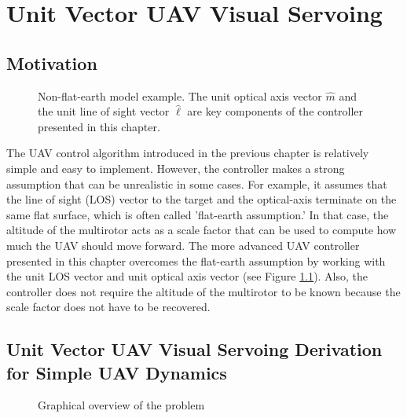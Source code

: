 \chapter{Unit Vector UAV Visual Servoing}
\label{chapter4}
\section{Motivation}
\begin{figure}[htbp]
	\centering
	\caption[Non-flat-earth model example.]{Non-flat-earth model example. The unit optical axis vector $\hat{m}$ and the unit line of sight vector $\hat{\ell}$ are key components of the controller presented in this chapter.}
	\label{nonflatearth}
\end{figure}
The UAV control algorithm introduced in the previous chapter is relatively simple and easy to implement. However, the controller makes a strong assumption that can be unrealistic in some cases. For example, it assumes that the line of sight (LOS) vector to the target and the optical-axis terminate on the same flat surface, which is often called 'flat-earth assumption.' In that case, the altitude of the multirotor acts as a scale factor that can be used to compute how much the UAV should move forward. The more advanced UAV controller presented in this chapter overcomes the flat-earth assumption by working with the unit LOS vector and unit optical axis vector (see Figure \ref{nonflatearth}). Also, the controller does not require the altitude of the multirotor to be known because the scale factor does not have to be recovered.

\section{Unit Vector UAV Visual Servoing Derivation for Simple UAV Dynamics}
\begin{figure}[htbp]
	\centering
	\caption{Graphical overview of the problem}
	\label{overview}
\end{figure}

